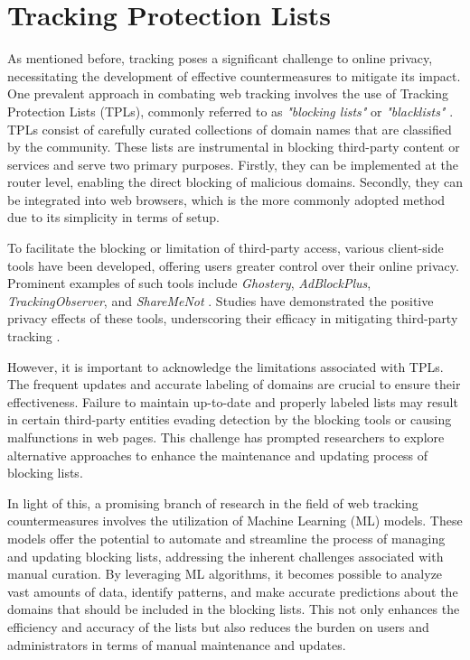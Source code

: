 \section{Tracking Protection Lists}

As mentioned before, tracking poses a significant challenge to online privacy, necessitating the development of effective countermeasures
to mitigate its impact. One prevalent approach in combating web tracking involves the use of Tracking Protection Lists (TPLs),
commonly referred to as \textit{"blocking lists"} or \textit{"blacklists"} \cite{bujlow2017survey,mayer2012third}. TPLs consist of carefully curated collections of domain names
that are classified by the community. These lists are instrumental in blocking third-party content or services and serve two
primary purposes. Firstly, they can be implemented at the router level, enabling the direct blocking of malicious domains.
Secondly, they can be integrated into web browsers, which is the more commonly adopted method due to its simplicity in terms of setup.

To facilitate the blocking or limitation of third-party access, various client-side tools have been developed, offering users greater
control over their online privacy. Prominent examples of such tools include \textit{Ghostery}, \textit{AdBlockPlus}, \textit{TrackingObserver}, and \textit{ShareMeNot}
\cite{ghostery, abp, trackingObserver, shareMeNot}.
Studies have demonstrated the positive privacy effects of these tools, underscoring their efficacy in mitigating third-party tracking \cite{kontaxis2015tracking}.

However, it is important to acknowledge the limitations associated with TPLs. The frequent updates and accurate labeling of domains are crucial
to ensure their effectiveness. Failure to maintain up-to-date and properly labeled lists may result in certain third-party entities evading detection
by the blocking tools or causing malfunctions in web pages. This challenge has prompted researchers to explore alternative approaches to enhance
the maintenance and updating process of blocking lists.

In light of this, a promising branch of research in the field of web tracking countermeasures involves the utilization of Machine Learning (ML)
models. These models offer the potential to automate and streamline the process of managing and updating blocking lists, addressing the inherent
challenges associated with manual curation. By leveraging ML algorithms, it becomes possible to analyze vast amounts of data,
identify patterns, and make accurate predictions about the domains that should be included in the blocking lists. This not only enhances the efficiency
and accuracy of the lists but also reduces the burden on users and administrators in terms of manual maintenance and updates.

